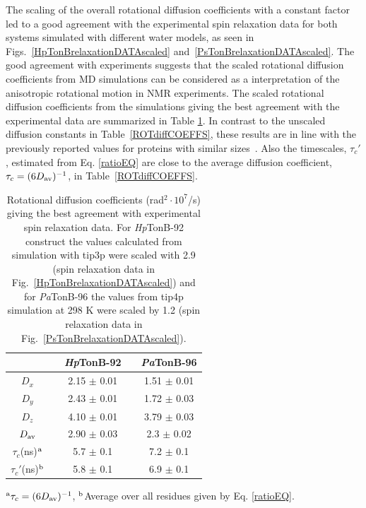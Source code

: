 \documentclass[journal=jpcbfk,manuscript=article]{achemso}
\begin{document}
The scaling of the overall rotational diffusion coefficients
with a constant factor led to a good agreement with the experimental
spin relaxation data for both systems simulated with different water models,
as seen in Figs.~\ref{HpTonBrelaxationDATAscaled} and~\ref{PsTonBrelaxationDATAscaled}.
The good agreement with experiments suggests that the scaled rotational diffusion coefficients
from MD simulations can be considered as a interpretation of the anisotropic rotational motion in NMR experiments.
The scaled rotational diffusion coefficients from the simulations giving the best agreement
with the experimental data are summarized in Table \ref{ROTdiffCOEFFSscaled}.
In contrast to the unscaled diffusion constants in Table~\ref{ROTdiffCOEFFS},
these results are in line with the previously reported values for proteins
with similar sizes~\cite{krishnan98}. Also the timescales, $\tau_{c}'$, estimated from 
Eq. \ref{ratioEQ} are close to the average diffusion coefficient, $\tau_{c}=(6D_{\rm av})^{-1}$,
in Table~\ref{ROTdiffCOEFFS}.
\begin{table}[!h]
  \centering
  \caption{Rotational diffusion coefficients (rad$^2\cdot 10^7$/s) giving the best agreement with experimental spin relaxation data.
    For {\it Hp}TonB-92 construct the values calculated from simulation with tip3p were scaled with 2.9
    (spin relaxation data in Fig.~\ref{HpTonBrelaxationDATAscaled}) and  for {\it Pa}TonB-96
    the values from tip4p simulation at 298 K were scaled by 1.2 (spin relaxation data in
    Fig.~\ref{PsTonBrelaxationDATAscaled}). 
  }\label{ROTdiffCOEFFSscaled}
  \begin{tabular}{c c c c c}
    &    &  {\it Hp}TonB-92  &  & {\it Pa}TonB-96 \\
    \hline
    $D_{x}$        &    &   2.15 $\pm$ 0.01  & & 1.51  $\pm$ 0.01\\
    $D_{y}$        &    &  2.43  $\pm$ 0.01  & & 1.72  $\pm$ 0.03\\
    $D_{z}$        &    &  4.10   $\pm$ 0.01 & & 3.79  $\pm$ 0.03\\
    $D_{\rm av}$        &    &   2.90  $\pm$ 0.03  & & 2.3  $\pm$ 0.02\\
    $\tau_{c}$(ns)$^{\rm a}$  &    &  5.7   $\pm$ 0.1  & & 7.2 $\pm$ 0.1 \\
    $\tau_{c}'$(ns)$^{\rm b}$  &    &  5.8   $\pm$ 0.1 & & 6.9   $\pm$ 0.1 \\
  \end{tabular}
  \newline
  \flushleft
  $^{\rm a}\tau_{c}=(6D_{\rm av})^{-1}$, $^{\rm b}$Average over all residues given by Eq. \ref{ratioEQ}.
\end{table} 
\end{document}
